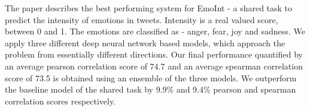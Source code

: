 The paper describes the best performing system for EmoInt - a shared task to predict the intensity of emotions in tweets. Intensity is a real valued score, between 0 and 1. The emotions are classified as - anger, fear, joy and sadness. We apply three different deep neural network based models, which approach the problem from essentially different directions. Our final performance quantified by an average pearson correlation score of 74.7 and an average spearman correlation score of 73.5 is obtained using an ensemble of the three models. We outperform the baseline model of the shared task by 9.9\% and 9.4\% pearson and spearman correlation scores respectively.
